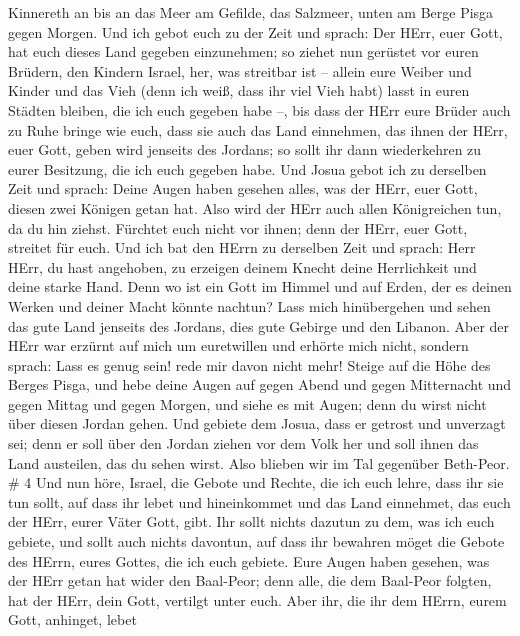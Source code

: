 Kinnereth an bis an das Meer am Gefilde, das Salzmeer, unten am Berge
Pisga gegen Morgen.  Und ich gebot euch zu der Zeit und
sprach: Der HErr, euer Gott, hat euch dieses Land gegeben einzunehmen;
so ziehet nun gerüstet vor euren Brüdern, den Kindern Israel, her, was
streitbar ist --  allein eure Weiber und Kinder und das
Vieh (denn ich weiß, dass ihr viel Vieh habt) lasst in euren Städten
bleiben, die ich euch gegeben habe --,  bis dass der HErr
eure Brüder auch zu Ruhe bringe wie euch, dass sie auch das Land
einnehmen, das ihnen der HErr, euer Gott, geben wird jenseits des
Jordans; so sollt ihr dann wiederkehren zu eurer Besitzung, die ich euch
gegeben habe.  Und Josua gebot ich zu derselben Zeit und
sprach: Deine Augen haben gesehen alles, was der HErr, euer Gott, diesen
zwei Königen getan hat. Also wird der HErr auch allen Königreichen tun,
da du hin ziehst.  Fürchtet euch nicht vor ihnen; denn der
HErr, euer Gott, streitet für euch.  Und ich bat den HErrn
zu derselben Zeit und sprach:  Herr HErr, du hast
angehoben, zu erzeigen deinem Knecht deine Herrlichkeit und deine starke
Hand. Denn wo ist ein Gott im Himmel und auf Erden, der es deinen Werken
und deiner Macht könnte nachtun?  Lass mich hinübergehen
und sehen das gute Land jenseits des Jordans, dies gute Gebirge und den
Libanon.  Aber der HErr war erzürnt auf mich um euretwillen
und erhörte mich nicht, sondern sprach: Lass es genug sein! rede mir
davon nicht mehr!  Steige auf die Höhe des Berges Pisga,
und hebe deine Augen auf gegen Abend und gegen Mitternacht und gegen
Mittag und gegen Morgen, und siehe es mit Augen; denn du wirst nicht
über diesen Jordan gehen.  Und gebiete dem Josua, dass er
getrost und unverzagt sei; denn er soll über den Jordan ziehen vor dem
Volk her und soll ihnen das Land austeilen, das du sehen wirst.
 Also blieben wir im Tal gegenüber Beth-Peor. \# 4
 Und nun höre, Israel, die Gebote und Rechte, die ich euch
lehre, dass ihr sie tun sollt, auf dass ihr lebet und hineinkommet und
das Land einnehmet, das euch der HErr, eurer Väter Gott, gibt.
 Ihr sollt nichts dazutun zu dem, was ich euch gebiete, und
sollt auch nichts davontun, auf dass ihr bewahren möget die Gebote des
HErrn, eures Gottes, die ich euch gebiete.  Eure Augen haben
gesehen, was der HErr getan hat wider den Baal-Peor; denn alle, die dem
Baal-Peor folgten, hat der HErr, dein Gott, vertilgt unter euch.
 Aber ihr, die ihr dem HErrn, eurem Gott, anhinget, lebet
